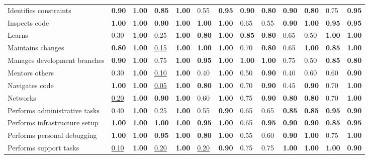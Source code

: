 \begin{tabular}{lllllllllllll}
Identifies constraints & \textbf{0.90} & \textbf{1.00} & \textbf{0.85} & \textbf{1.00} & 0.55 & \textbf{0.95} & \textbf{0.90} & \textbf{0.80} & \textbf{0.90} & \textbf{0.80} & 0.75 & \textbf{0.95} \\
Inspects code & \textbf{1.00} & \textbf{1.00} & \textbf{0.90} & \textbf{1.00} & \textbf{1.00} & \textbf{1.00} & 0.65 & 0.55 & \textbf{0.90} & \textbf{1.00} & \textbf{0.95} & \textbf{0.95} \\
Learns & 0.30 & \textbf{1.00} & 0.25 & \textbf{1.00} & \textbf{0.80} & \textbf{1.00} & \textbf{0.85} & \textbf{0.80} & 0.65 & 0.50 & \textbf{1.00} & \textbf{1.00} \\
Maintains changes & \textbf{0.80} & \textbf{1.00} & \underline{0.15} & \textbf{1.00} & \textbf{1.00} & \textbf{1.00} & 0.70 & \textbf{0.80} & 0.65 & \textbf{1.00} & \textbf{0.85} & \textbf{1.00} \\
Manages development branches & \textbf{0.90} & \textbf{1.00} & 0.75 & \textbf{1.00} & \textbf{0.95} & \textbf{1.00} & \textbf{1.00} & \textbf{1.00} & 0.75 & 0.50 & \textbf{0.85} & \textbf{0.80} \\
Mentors others & 0.30 & \textbf{1.00} & \underline{0.10} & \textbf{1.00} & 0.40 & \textbf{1.00} & 0.50 & \textbf{0.90} & 0.40 & 0.60 & 0.60 & \textbf{0.90} \\
Navigates code & \textbf{1.00} & \textbf{1.00} & \underline{0.05} & \textbf{1.00} & \textbf{0.80} & \textbf{1.00} & 0.70 & \textbf{0.90} & 0.45 & \textbf{0.90} & 0.70 & \textbf{1.00} \\
Networks & \underline{0.20} & \textbf{1.00} & \textbf{0.90} & \textbf{1.00} & 0.60 & \textbf{1.00} & 0.75 & \textbf{0.90} & \textbf{0.80} & \textbf{0.80} & 0.70 & \textbf{1.00} \\
Performs administrative tasks & 0.40 & \textbf{1.00} & 0.25 & \textbf{1.00} & 0.55 & \textbf{0.90} & 0.65 & 0.65 & \textbf{0.85} & \textbf{0.85} & \textbf{0.95} & \textbf{0.90} \\
Performs infrastructure setup & \textbf{1.00} & \textbf{1.00} & \textbf{1.00} & \textbf{1.00} & \textbf{0.95} & \textbf{1.00} & 0.65 & \textbf{0.95} & \textbf{0.90} & \textbf{0.90} & \textbf{0.85} & \textbf{0.95} \\
Performs personal debugging & \textbf{1.00} & \textbf{1.00} & \textbf{0.95} & \textbf{1.00} & \textbf{0.80} & \textbf{1.00} & 0.55 & 0.60 & \textbf{0.90} & \textbf{1.00} & 0.75 & \textbf{1.00} \\
Performs support tasks & \underline{0.10} & \textbf{1.00} & \underline{0.20} & \textbf{1.00} & \underline{0.20} & \textbf{0.90} & 0.75 & 0.75 & \textbf{1.00} & \textbf{1.00} & \textbf{1.00} & \textbf{0.90} \\

\end{tabular}
